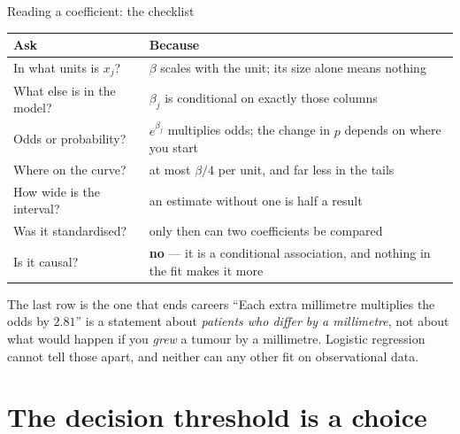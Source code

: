 \documentclass[aspectratio=169]{beamer}
\begin{document}
\begin{frame}[shrink=6]{Reading a coefficient: the checklist}
  \begin{center}\small
  \begin{tabular}{@{}p{}p{}@{}}
    \toprule
    \textbf{Ask} & \textbf{Because}\\
    \midrule
    In what units is $x_j$? & $\beta$ scales with the unit; its size alone
      means nothing\\[3pt]
    What else is in the model? & $\beta_j$ is conditional on exactly those
      columns\\[3pt]
    Odds or probability? & $e^{\beta_j}$ multiplies odds; the change in $p$
      depends on where you start\\[3pt]
    Where on the curve? & at most $\beta/4$ per unit, and far less in the
      tails\\[3pt]
    How wide is the interval? & an estimate without one is half a result\\[3pt]
    Was it standardised? & only then can two coefficients be compared\\[3pt]
    Is it causal? & \textbf{no} --- it is a conditional association, and
      nothing in the fit makes it more\\
    \bottomrule
  \end{tabular}
  \end{center}
  \vspace{0.2em}
  \begin{alertblock}{The last row is the one that ends careers}
    \footnotesize ``Each extra millimetre multiplies the odds by $2.81$'' is a
    statement about \emph{patients who differ by a millimetre}, not about what
    would happen if you \emph{grew} a tumour by a millimetre. Logistic
    regression cannot tell those apart, and neither can any other fit on
    observational data.
  \end{alertblock}
\end{frame}

\section[Threshold]{The decision threshold is a choice}
\label{sec:thresh}
\end{document}
